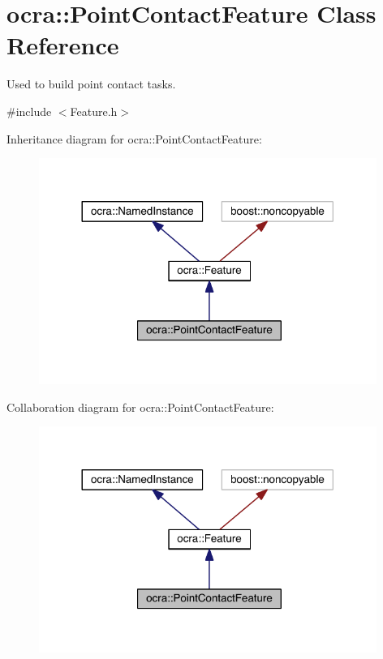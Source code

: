 \hypertarget{classocra_1_1PointContactFeature}{}\section{ocra\+:\+:Point\+Contact\+Feature Class Reference}
\label{classocra_1_1PointContactFeature}


Used to build point contact tasks.  




{\ttfamily \#include $<$Feature.\+h$>$}



Inheritance diagram for ocra\+:\+:Point\+Contact\+Feature\+:\nopagebreak
\begin{figure}[H]
\begin{center}
\leavevmode
\includegraphics[width=312pt]{dc/dca/classocra_1_1PointContactFeature__inherit__graph}
\end{center}
\end{figure}


Collaboration diagram for ocra\+:\+:Point\+Contact\+Feature\+:\nopagebreak
\begin{figure}[H]
\begin{center}
\leavevmode
\includegraphics[width=312pt]{d6/d45/classocra_1_1PointContactFeature__coll__graph}
\end{center}
\end{figure}
